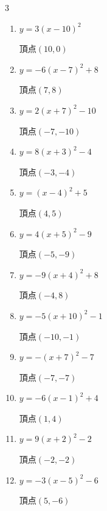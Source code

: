 \begin{multicols}{3}
\begin{enumerate}
  \item $\displaystyle y=3\left( x-10\right)^{2}$

        $\displaystyle 頂点\left( 10 , 0 \right)$

  \item $\displaystyle y=-6\left( x-7\right)^{2}+8$

        $\displaystyle 頂点\left( 7 , 8 \right)$

  \item $\displaystyle y=2\left( x+7\right)^{2}-10$

        $\displaystyle 頂点\left( -7 , -10 \right)$

  \item $\displaystyle y=8\left( x+3\right)^{2}-4$

        $\displaystyle 頂点\left( -3 , -4 \right)$

  \item $\displaystyle y=\left( x-4\right)^{2}+5$

        $\displaystyle 頂点\left( 4 , 5 \right)$

  \item $\displaystyle y=4\left( x+5\right)^{2}-9$

        $\displaystyle 頂点\left( -5 , -9 \right)$

  \item $\displaystyle y=-9\left( x+4\right)^{2}+8$

        $\displaystyle 頂点\left( -4 , 8 \right)$

  \item $\displaystyle y=-5\left( x+10\right)^{2}-1$

        $\displaystyle 頂点\left( -10 , -1 \right)$

  \item $\displaystyle y=-\left( x+7\right)^{2}-7$

        $\displaystyle 頂点\left( -7 , -7 \right)$

  \item $\displaystyle y=-6\left( x-1\right)^{2}+4$

        $\displaystyle 頂点\left( 1 , 4 \right)$

  \item $\displaystyle y=9\left( x+2\right)^{2}-2$

        $\displaystyle 頂点\left( -2 , -2 \right)$

  \item $\displaystyle y=-3\left( x-5\right)^{2}-6$

        $\displaystyle 頂点\left( 5 , -6 \right)$


\end{enumerate}
\end{multicols}
